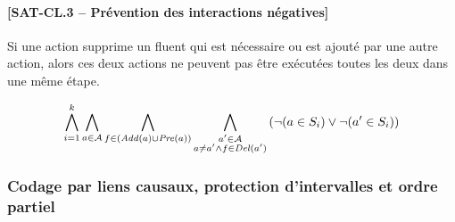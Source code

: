
\paragraph*{[SAT-CL.3 -- Prévention des interactions négatives]}
Si une action supprime un fluent qui est nécessaire ou est ajouté par une autre action, alors ces deux actions ne peuvent pas être exécutées toutes les deux dans une même étape.

\begin{small}
\[
\bigwedge\limits_{\substack{i=1}}^{k}\bigwedge\limits_{\substack{\substack{a\in \mathcal{A}}}}\bigwedge\limits_{\substack{\substack{f\in \left(\mathit{Add}(a)\cup\mathit{Pre}(a)\right)}}}\bigwedge\limits_{\substack{\substack{a'\in \mathcal{A}\\a \neq a' \wedge f \in \mathit{Del}(a')}}}\left(\neg (a \in S_{i}) \vee \neg (a' \in S_{i})\right)
\]
\end{small}

\subsubsection{Codage par liens causaux, protection d'intervalles et ordre partiel}

